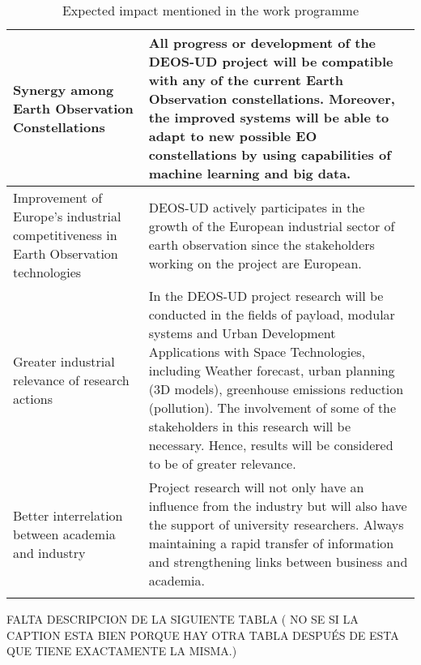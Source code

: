\begin{longtable}{p{3cm} p{11cm}}
		\midrule
		
		Synergy among Earth Observation Constellations & All progress or development of the DEOS-UD project will be compatible with any of the current Earth Observation constellations. Moreover, the improved systems will be able to adapt to new possible EO constellations by using capabilities of machine learning and big data.\vspace{0.2cm}\\
		
		\midrule
		
		Improvement of Europe’s industrial competitiveness in Earth Observation technologies & DEOS-UD actively participates in the growth of the European industrial sector of earth observation since the stakeholders working on the project are European.\vspace{0.2cm}\\
		
		\midrule
		
		Greater industrial relevance of research actions & In the DEOS-UD project research will be conducted in the fields of payload, modular systems and Urban Development Applications with Space Technologies, including Weather forecast, urban planning (3D models), greenhouse emissions reduction (pollution). The involvement of some of the stakeholders in this research will be necessary. Hence, results will be considered to be of greater relevance.\vspace{0.2cm}\\
		
		\midrule
		
		Better interrelation between academia and industry & Project research will not only have an influence from the industry but will also have the support of university researchers. Always maintaining a rapid transfer of information and strengthening links between business and academia.\vspace{0.2cm}\\
		
		
		\bottomrule[2pt]
		

	\caption{Expected impact mentioned in the work programme}
\end{longtable}

FALTA DESCRIPCION DE LA SIGUIENTE TABLA ( NO SE SI LA CAPTION ESTA BIEN PORQUE HAY OTRA TABLA DESPUÉS DE ESTA QUE TIENE EXACTAMENTE LA MISMA.)

